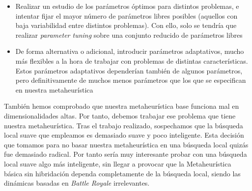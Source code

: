 \documentclass[11pt]{article}
\begin{document}
\begin{itemize}
    \item Realizar un estudio de los parámetros óptimos para distintos problemas, e intentar fijar el mayor número de parámetros libres posibles (aquellos con baja variabilidad entre distintos problemas). Con ello, solo se tendría que realizar \emph{parameter tuning} sobre una conjunto reducido de parámetros libres
    \item De forma alternativa o adicional, introducir parámetros adaptativos, mucho más flexibles a la hora de trabajar con problemas de distintas características. Estos parámetros adaptativos dependerían también de algunos parámetros, pero definitivamente de muchos menos parámetros que los que se especifican en nuestra metaheurística
\end{itemize}

También hemos comprobado que nuestra metaheurística base funciona mal en dimensionalidades altas. Por tanto, debemos trabajar ese problema que tiene nuestra metaheurística. Tras el trabajo realizado, sospechamos que la búsqueda local suave que empleamos es demasiado suave y poco inteligente. Esta decisión que tomamos para no basar nuestra metaheurística en una búsqueda local quizás fue demasiado radical. Por tanto sería muy interesante probar con una búsqueda local suave algo más inteligente, sin llegar a provocar que la Metaheurística básica sin hibridación dependa completamente de la búsqueda local, siendo las dinámicas basadas en \emph{Battle Royale} irrelevantes.

\pagebreak



\end{document}
